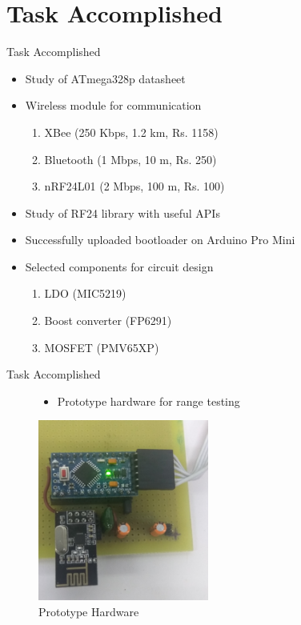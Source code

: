\documentclass[10pt, a4paper]{beamer}
\begin{document}
\section{Task Accomplished}
\begin{frame}{Task Accomplished}
	\begin{itemize}
		\item  Study of ATmega328p datasheet
         \item Wireless module for communication
    	  \begin{enumerate}
    	     \item XBee (250 Kbps, 1.2 km, Rs. 1158)
     		 \item Bluetooth (1 Mbps, 10 m, Rs. 250)
     		 \item nRF24L01 (2 Mbps, 100 m, Rs. 100)
         \end{enumerate}
        \item Study of RF24 library with useful APIs
        \item Successfully uploaded bootloader on Arduino Pro Mini
        \item Selected components for circuit design
        \begin{enumerate}
        \item LDO (MIC5219)
        \item Boost converter (FP6291)
    	\item MOSFET (PMV65XP)
        \end{enumerate}
        
 \end{itemize}

\end{frame}

\begin{frame}{Task Accomplished}
\begin{figure}
\begin{itemize}
\item Prototype hardware for range testing
\end{itemize}
\begin{center}
\includegraphics[width=0.5\textwidth]{IMG_20180605_144752.jpg}
\caption{Prototype Hardware}
\end{center}
\end{figure}

\end{frame}
\end{document}
